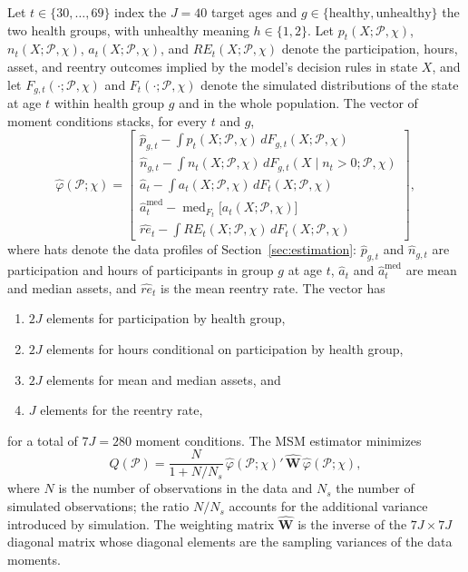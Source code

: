 Let $t\in\{30,\dots,69\}$ index the $J=40$ target ages and $g\in\{\text{healthy},\text{unhealthy}\}$ the two health groups, with unhealthy meaning $h\in\{1,2\}$. Let $p_t(X;\mathcal{P},\chi)$, $n_t(X;\mathcal{P},\chi)$, $a_t(X;\mathcal{P},\chi)$, and $RE_t(X;\mathcal{P},\chi)$ denote the participation, hours, asset, and reentry outcomes implied by the model's decision rules in state $X$, and let $F_{g,t}(\cdot;\mathcal{P},\chi)$ and $F_t(\cdot;\mathcal{P},\chi)$ denote the simulated distributions of the state at age $t$ within health group $g$ and in the whole population. The vector of moment conditions stacks, for every $t$ and $g$,
\[
\hat{\varphi}(\mathcal{P};\chi)=
\begin{bmatrix}
\hat{p}_{g,t}-\int p_t(X;\mathcal{P},\chi)\,dF_{g,t}(X;\mathcal{P},\chi)\\[0.3ex]
\hat{n}_{g,t}-\int n_t(X;\mathcal{P},\chi)\,dF_{g,t}(X\mid n_t>0;\mathcal{P},\chi)\\[0.3ex]
\hat{a}_{t}-\int a_t(X;\mathcal{P},\chi)\,dF_{t}(X;\mathcal{P},\chi)\\[0.3ex]
\hat{a}^{\mathrm{med}}_{t}-\operatorname{med}_{F_t}\big[a_t(X;\mathcal{P},\chi)\big]\\[0.3ex]
\widehat{re}_{t}-\int RE_t(X;\mathcal{P},\chi)\,dF_{t}(X;\mathcal{P},\chi)
\end{bmatrix},
\]
where hats denote the data profiles of Section~\ref{sec:estimation}: $\hat{p}_{g,t}$ and $\hat{n}_{g,t}$ are participation and hours of participants in group $g$ at age $t$, $\hat{a}_t$ and $\hat{a}^{\mathrm{med}}_t$ are mean and median assets, and $\widehat{re}_t$ is the mean reentry rate. The vector has
\begin{enumerate}[label=(\roman*)]
\item $2J$ elements for participation by health group,
\item $2J$ elements for hours conditional on participation by health group,
\item $2J$ elements for mean and median assets, and
\item $J$ elements for the reentry rate,
\end{enumerate}
for a total of $7J=280$ moment conditions. The MSM estimator minimizes
\[
Q(\mathcal{P})=\frac{N}{1+N/N_s}\,\hat{\varphi}(\mathcal{P};\chi)'\,\hat{\mathbf{W}}\,\hat{\varphi}(\mathcal{P};\chi),
\]
where $N$ is the number of observations in the data and $N_s$ the number of simulated observations; the ratio $N/N_s$ accounts for the additional variance introduced by simulation. The weighting matrix $\hat{\mathbf{W}}$ is the inverse of the $7J\times7J$ diagonal matrix whose diagonal elements are the sampling variances of the data moments.

